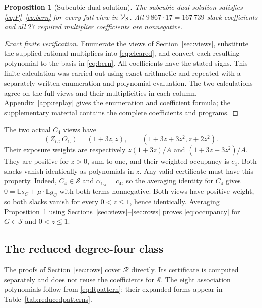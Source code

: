 \documentclass[11pt]{article}
\newtheorem{proposition}[theorem]{Proposition}
\newcommand{\E}{\mathbb E}\newcommand{\Prob}{\mathbb P}
\begin{document}
\begin{proposition}[Subcubic dual solution]\label{prop:certificate}
The subcubic dual solution satisfies \eqref{eq:P}--\eqref{eq:bern} for every full view in $\mathcal V_{\mathcal S}$. All $9\,867\cdot17=167\,739$ slack coefficients and all $27$ required multiplier coefficients are nonnegative.
\end{proposition}
\begin{proof}[Exact finite verification]
Enumerate the views of Section~\ref{sec:views}, substitute the supplied rational multipliers into \eqref{eq:cleared}, and convert each resulting polynomial to the basis in \eqref{eq:bern}. All coefficients have the stated signs. This finite calculation was carried out using exact arithmetic and repeated with a separately written enumeration and polynomial evaluation. The two calculations agree on the full views and their multiplicities in each column. Appendix~\ref{app:replay} gives the enumeration and coefficient formula; the supplementary material contains the complete coefficients and programs.
\end{proof}
The two actual $C_4$ views have
\[
 (Z_C,O_C)=(1+3z,z),\qquad(1+3z+3z^2,z+2z^2).
\]
Their exposure weights are respectively $z(1+3z)/A$ and $(1+3z+3z^2)/A$. They are positive for $z>0$, sum to one, and their weighted occupancy is $c_4$. Both slacks vanish identically as polynomials in $z$. Any valid certificate must have this property. Indeed, $C_4\in\mathcal S$ and $\alpha_{C_4}=c_4$, so the averaging identity for $C_4$ gives $0=\E s_C+\mu\cdot\E g_C$ with both terms nonnegative. Both views have positive weight, so both slacks vanish for every $0<z\le1$, hence identically. Averaging Proposition~\ref{prop:certificate} using Sections~\ref{sec:views}--\ref{sec:rows} proves \eqref{eq:occupancy} for $G\in\mathcal S$ and $0<z\le1$.

\subsection{The reduced degree-four class}\label{sec:reducedcert}
The proofs of Section~\ref{sec:rows} cover $\mathcal R$ directly. Its certificate is computed separately and does not reuse the coefficients for $\mathcal S$. The eight association polynomials follow from \eqref{eq:Rpattern}; their expanded forms appear in Table~\ref{tab:reducedpatterns}.
\end{document}
